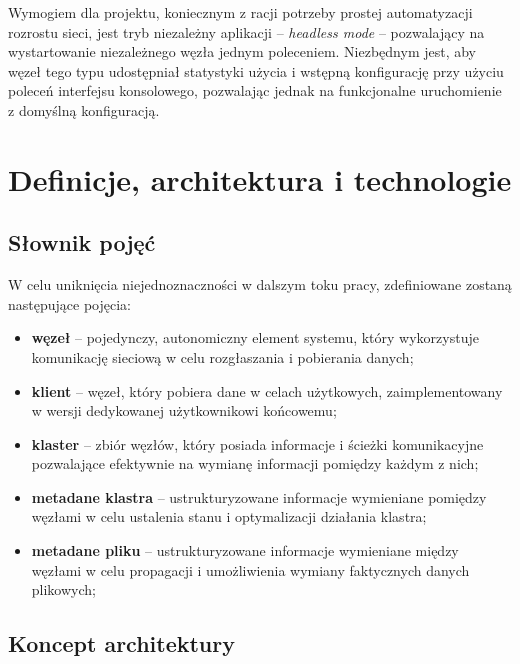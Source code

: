 Wymogiem dla projektu, koniecznym z racji potrzeby prostej automatyzacji rozrostu sieci, jest tryb niezależny aplikacji -- {\em headless mode} -- pozwalający na wystartowanie niezależnego węzła jednym poleceniem. Niezbędnym jest, aby węzeł tego typu udostępniał statystyki użycia i wstępną konfigurację przy użyciu poleceń interfejsu konsolowego, pozwalając jednak na funkcjonalne uruchomienie z domyślną konfiguracją.


\section{Definicje, architektura i technologie}
\label{sec:zalozeniaProjektu}

\subsection{Słownik pojęć}

W celu uniknięcia niejednoznaczności w dalszym toku pracy, zdefiniowane zostaną następujące pojęcia:

\begin{itemize}
    \item \textbf{węzeł} -- pojedynczy, autonomiczny element systemu, który wykorzystuje komunikację sieciową w celu rozgłaszania i pobierania danych;
    \item \textbf{klient} -- węzeł, który pobiera dane w celach użytkowych, zaimplementowany w wersji dedykowanej użytkownikowi końcowemu;
    \item \textbf{klaster} -- zbiór węzłów, który posiada informacje i ścieżki komunikacyjne pozwalające efektywnie na wymianę informacji pomiędzy każdym z nich;
    \item \textbf{metadane klastra} -- ustrukturyzowane informacje wymieniane pomiędzy węzłami w celu ustalenia stanu i optymalizacji działania klastra;
    \item \textbf{metadane pliku} -- ustrukturyzowane informacje wymieniane między węzłami w celu propagacji i umożliwienia wymiany faktycznych danych plikowych;
\end{itemize}

\subsection{Koncept architektury}

